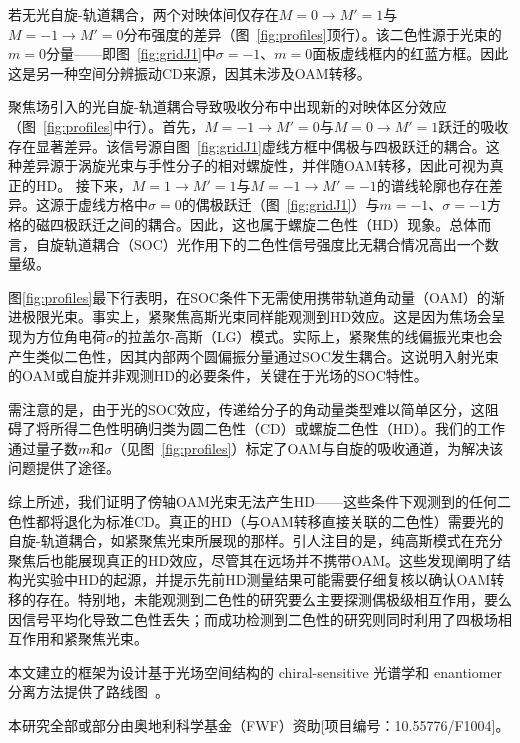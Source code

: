 \documentclass[reprint,aps,prl,twocolumn,superscriptaddress,groupedaddress]{revtex4-2}
\begin{document}
若无光自旋-轨道耦合，两个对映体间仅存在$M=0\to M'=1$与$M=-1\to M'=0$分布强度的差异（图~\ref{fig:profiles}顶行）。该二色性源于光束的$m=0$分量——即图~\ref{fig:gridJ1}中$\sigma=-1$、$m=0$面板虚线框内的红蓝方框。因此这是另一种空间分辨振动CD来源，因其未涉及OAM转移。

聚焦场引入的光自旋-轨道耦合导致吸收分布中出现新的对映体区分效应（图~\ref{fig:profiles}中行）。首先，$M=-1\to M'=0$与$M=0\to M'=1$跃迁的吸收存在显著差异。该信号源自图~\ref{fig:gridJ1}虚线方框中偶极与四极跃迁的耦合。这种差异源于涡旋光束与手性分子的相对螺旋性，并伴随OAM转移，因此可视为真正的HD。
接下来，$M=1\to M'=1$与$M=-1\to M'=-1$的谱线轮廓也存在差异。这源于虚线方格中$\sigma=0$的偶极跃迁（图~\ref{fig:gridJ1}）与$m=-1$、$\sigma=-1$方格的磁四极跃迁之间的耦合。因此，这也属于螺旋二色性（HD）现象。总体而言，自旋轨道耦合（SOC）光作用下的二色性信号强度比无耦合情况高出一个数量级。

图\ref{fig:profiles}最下行表明，在SOC条件下无需使用携带轨道角动量（OAM）的渐进极限光束。事实上，紧聚焦高斯光束同样能观测到HD效应。这是因为焦场会呈现为方位角电荷$\sigma$的拉盖尔-高斯（LG）模式。实际上，紧聚焦的线偏振光束也会产生类似二色性，因其内部两个圆偏振分量通过SOC发生耦合。这说明入射光束的OAM或自旋并非观测HD的必要条件，关键在于光场的SOC特性。

需注意的是，由于光的SOC效应，传递给分子的角动量类型难以简单区分，这阻碍了将所得二色性明确归类为圆二色性（CD）或螺旋二色性（HD）。我们的工作通过量子数$m$和$\sigma$（见图~\ref{fig:profiles}）标定了OAM与自旋的吸收通道，为解决该问题提供了途径。

综上所述，我们证明了傍轴OAM光束无法产生HD——这些条件下观测到的任何二色性都将退化为标准CD。真正的HD（与OAM转移直接关联的二色性）需要光的自旋-轨道耦合，如紧聚焦光束所展现的那样。引人注目的是，纯高斯模式在充分聚焦后也能展现真正的HD效应，尽管其在远场并不携带OAM。这些发现阐明了结构光实验中HD的起源，并提示先前HD测量结果可能需要仔细复核以确认OAM转移的存在。特别地，未能观测到二色性的研究要么主要探测偶极级相互作用\cite{Araoka2005}，要么因信号平均化导致二色性丢失\cite{Loeffler2011}；而成功检测到二色性的研究则同时利用了四极场相互作用和紧聚焦光束\cite{Rusak2019,Rouxel2022,Begin2023,Jain2023}。

本文建立的框架为设计基于光场空间结构的 chiral-sensitive 光谱学和 enantiomer 分离方法提供了路线图~\cite{Leibscher2022}。\\
\begin{acknowledgments}
本研究全部或部分由奥地利科学基金（FWF）资助[项目编号：10.55776/F1004]。
\end{acknowledgments}

\end{document}
